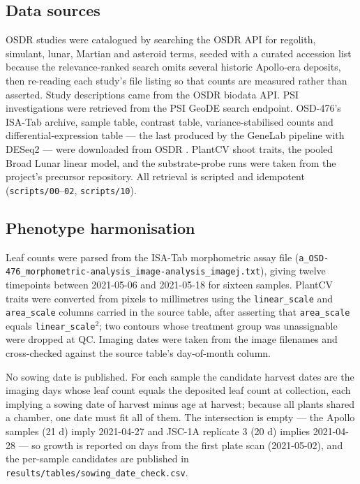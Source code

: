 \documentclass[11pt,a4paper]{article}
\begin{document}
\subsection{Data sources}
OSDR studies were catalogued by searching the OSDR API for regolith, simulant, lunar,
Martian and asteroid terms, seeded with a curated accession list because the
relevance-ranked search omits several historic Apollo-era deposits, then re-reading each
study's file listing so that counts are measured rather than asserted. Study descriptions
came from the OSDR biodata API. PSI investigations were retrieved from the PSI GeoDE
search endpoint. OSD-476's ISA-Tab archive, sample table, contrast table, variance-stabilised
counts and differential-expression table --- the last produced by the GeneLab pipeline with DESeq2
\citep{love2014deseq2} --- were downloaded from OSDR \citep{berrios2021genelab,osdr476}. PlantCV shoot traits, the pooled Broad Lunar linear
model, and the substrate-probe runs were taken from the project's precursor repository.
All retrieval is scripted and idempotent (\texttt{scripts/00}--\texttt{02},
\texttt{scripts/10}).

\subsection{Phenotype harmonisation}
Leaf counts were parsed from the ISA-Tab morphometric assay file
(\texttt{a\_OSD-476\_morphometric-analysis\_image-analysis\_imagej.txt}), giving twelve
timepoints between 2021-05-06 and 2021-05-18 for sixteen samples. PlantCV traits were
converted from pixels to millimetres using the \texttt{linear\_scale} and
\texttt{area\_scale} columns carried in the source table, after asserting that
\texttt{area\_scale} equals \texttt{linear\_scale}$^2$; two contours whose treatment
group was unassignable were dropped at QC. Imaging dates were taken from the image
filenames and cross-checked against the source table's day-of-month column.

No sowing date is published. For each sample the candidate harvest dates are the imaging
days whose leaf count equals the deposited leaf count at collection, each implying a
sowing date of harvest minus age at harvest; because all plants shared a chamber, one
date must fit all of them. The intersection is empty --- the Apollo samples (21 d) imply
2021-04-27 and JSC-1A replicate 3 (20 d) implies 2021-04-28 --- so growth is reported on
days from the first plate scan (2021-05-02), and the per-sample candidates are published
in \texttt{results/tables/sowing\_date\_check.csv}.
\end{document}

